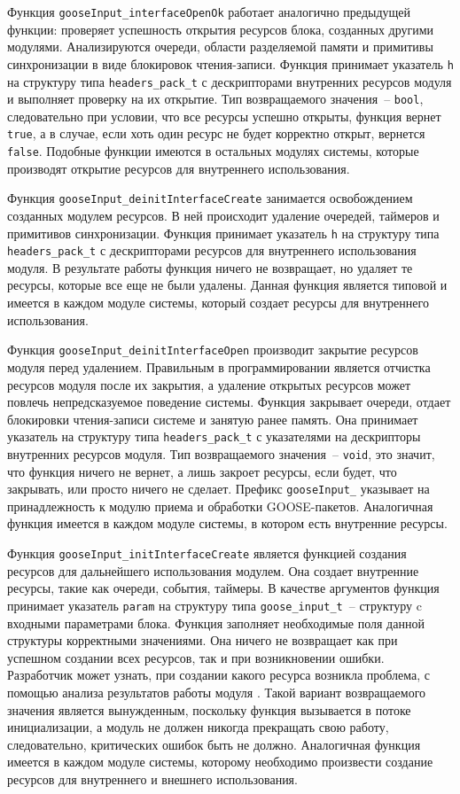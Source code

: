 Функция \lstinline{gooseInput_interfaceOpenOk} работает аналогично предыдущей
функции:
проверяет успешность открытия ресурсов блока, созданных другими модулями.
Анализируются очереди, области разделяемой памяти и примитивы синхронизации
в виде блокировок чтения-записи. Функция принимает указатель \lstinline{h}
на структуру типа \lstinline{headers_pack_t}
с дескрипторами внутренних ресурсов модуля и выполняет проверку
на их открытие.
Тип возвращаемого значения~-- \lstinline{bool}, следовательно при условии, что
все ресурсы успешно открыты, функция вернет \lstinline{true}, а в случае,
если хоть один ресурс не будет корректно открыт, вернется \lstinline{false}.
Подобные функции имеются в остальных модулях системы,
которые производят открытие ресурсов для внутреннего использования.

Функция \lstinline{gooseInput_deinitInterfaceCreate} занимается освобождением созданных модулем ресурсов. В ней происходит удаление очередей, таймеров
и примитивов синхронизации.
Функция принимает указатель \lstinline{h} на структуру типа
\lstinline{headers_pack_t} с дескрипторами ресурсов для внутреннего использования
модуля.
В результате работы функция ничего не возвращает, но удаляет те ресурсы,
которые все еще не были удалены.
Данная функция является типовой и имеется в каждом модуле системы,
который создает ресурсы для внутреннего использования.

Функция \lstinline{gooseInput_deinitInterfaceOpen} производит закрытие ресурсов модуля перед удалением. Правильным в программировании является отчистка ресурсов модуля после их закрытия, а удаление открытых ресурсов может повлечь непредсказуемое поведение системы. Функция закрывает очереди, отдает блокировки чтения-записи системе и занятую ранее память. Она принимает указатель на структуру типа \lstinline{headers_pack_t} с указателями на дескрипторы внутренних ресурсов модуля. Тип возвращаемого значения~-- \lstinline{void}, это значит, что функция ничего не вернет, а лишь закроет ресурсы, если будет, что закрывать, или просто ничего не сделает. Префикс \lstinline{gooseInput_} указывает на принадлежность к модулю приема и обработки GOOSE-пакетов. Аналогичная функция имеется в каждом модуле системы, в котором есть внутренние ресурсы.

Функция \lstinline{gooseInput_initInterfaceCreate} является функцией создания
ресурсов для дальнейшего использования модулем.
Она создает внутренние ресурсы, такие как очереди, события, таймеры.
В качестве аргументов функция принимает указатель \lstinline{param}
на структуру типа \lstinline{goose_input_t}~-- структуру
c входными параметрами блока. Функция заполняет необходимые поля
данной структуры корректными значениями. Она ничего не возвращает
как при успешном создании всех ресурсов, так и при возникновении ошибки.
Разработчик может узнать, при создании какого ресурса возникла проблема,
с помощью анализа результатов работы модуля \moduleLog.
Такой вариант возвращаемого
значения является вынужденным, поскольку функция вызывается в потоке инициализации,
а модуль не должен никогда прекращать свою работу, следовательно, критических ошибок
быть не должно. Аналогичная функция имеется в каждом модуле системы,
которому необходимо произвести создание ресурсов для внутреннего и внешнего
использования.

